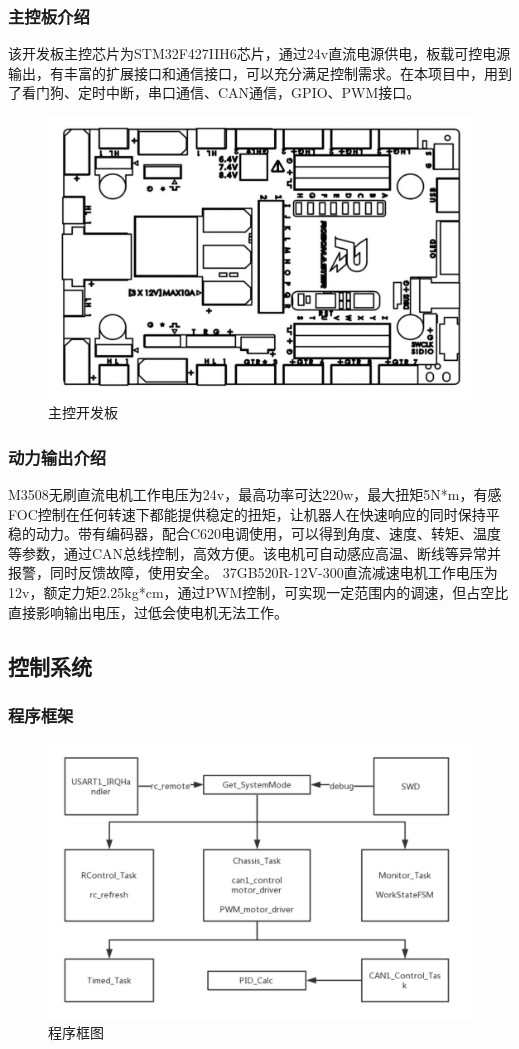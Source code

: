 \documentclass[12pt]{article}
\begin{document}
\begin{CJK}{UTF8}{song}
\subsubsection{主控板介绍}
该开发板主控芯片为STM32F427IIH6芯片，通过24v直流电源供电，板载可控电源输出，有丰富的扩展接口和通信接口，可以充分满足控制需求。在本项目中，用到了看门狗、定时中断，串口通信、CAN通信，GPIO、PWM接口。
 \begin{figure}[H]
\centering
\includegraphics[width=.8\textwidth]{chap5//fig5.jpg}
\caption{主控开发板}
\end{figure}
\subsubsection{动力输出介绍}
M3508无刷直流电机工作电压为24v，最高功率可达220w，最大扭矩5N*m，有感FOC控制在任何转速下都能提供稳定的扭矩，让机器人在快速响应的同时保持平稳的动力。带有编码器，配合C620电调使用，可以得到角度、速度、转矩、温度等参数，通过CAN总线控制，高效方便。该电机可自动感应高温、断线等异常并报警，同时反馈故障，使用安全。
37GB520R-12V-300直流减速电机工作电压为12v，额定力矩2.25kg*cm，通过PWM控制，可实现一定范围内的调速，但占空比直接影响输出电压，过低会使电机无法工作。
\subsection{控制系统}
\subsubsection{程序框架}
 \begin{figure}[H]
\centering
\includegraphics[width=.8\textwidth]{chap5//fig6.jpg}
\caption{程序框图}
\end{figure}

\end{CJK}
\end{document}
